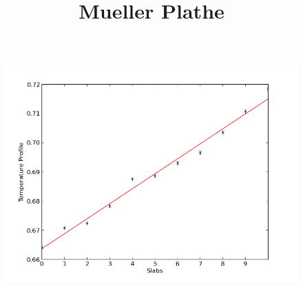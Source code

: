 \documentclass[12pt,a4paper]{article}
\author{}
\date{}
\title{Mueller Plathe}
\begin{document}
\maketitle
\paragraph{} 
\begin{figure}[h]
  \includegraphics[width=\linewidth]{1.png}
\end{figure}
\end{document}
